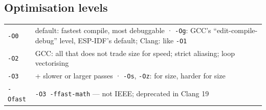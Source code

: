 \documentclass[8pt]{extarticle}
\newcommand\ct[1]{\texttt{#1}}
\begin{document}
\begin{multicols}{2}
\section{Optimisation levels}
{\scriptsize\setlength{\tabcolsep}{2pt}
\begin{tabular}{@{}L{9mm}L{68mm}@{}}
\ct{-O0} & default: fastest compile, most debuggable · \ct{-Og}: GCC's ``edit-compile-debug'' level, ESP-IDF's default; Clang: like \ct{-O1}\\
\ct{-O2} & GCC: all that does not trade size for speed; strict aliasing; loop vectorising\\
\ct{-O3} & + slower or larger passes · \ct{-Os}, \ct{-Oz}: for size, harder for size\\
\ct{-Ofast} & \ct{-O3 -ffast-math} — not IEEE; deprecated in Clang 19\\
\end{tabular}}


\end{multicols}
\end{document}

